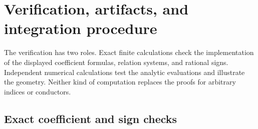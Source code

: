 \section{Verification, artifacts, and integration procedure}
\label{verify:sec:reproduction}

The verification has two roles. Exact finite calculations check the
implementation of the displayed coefficient formulas, relation systems,
and rational signs. Independent numerical calculations test the analytic
evaluations and illustrate the geometry. Neither kind of computation
replaces the proofs for arbitrary indices or conductors.

\subsection{Exact coefficient and sign checks}

